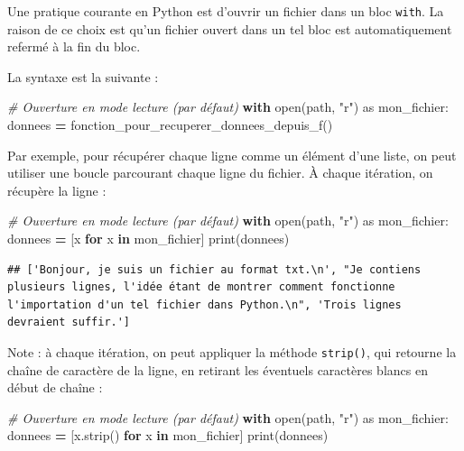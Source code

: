 \documentclass[12pt,]{book}
\newenvironment{Shaded}{\begin{snugshade}}{\end{snugshade}}
\newcommand{\KeywordTok}[1]{\textcolor[rgb]{0.13,0.29,0.53}{\textbf{#1}}}
\newcommand{\StringTok}[1]{\textcolor[rgb]{0.31,0.60,0.02}{#1}}
\newcommand{\ImportTok}[1]{#1}
\newcommand{\CommentTok}[1]{\textcolor[rgb]{0.56,0.35,0.01}{\textit{#1}}}
\newcommand{\ControlFlowTok}[1]{\textcolor[rgb]{0.13,0.29,0.53}{\textbf{#1}}}
\newcommand{\OperatorTok}[1]{\textcolor[rgb]{0.81,0.36,0.00}{\textbf{#1}}}
\newcommand{\BuiltInTok}[1]{#1}
\newcommand{\NormalTok}[1]{#1}
\numberwithin{equation}{section}
\numberwithin{countremarque}{section}
\begin{document}
Une pratique courante en Python est d'ouvrir un fichier dans un bloc
\texttt{with}. La raison de ce choix est qu'un fichier ouvert dans un
tel bloc est automatiquement refermé à la fin du bloc.

La syntaxe est la suivante :

\begin{Shaded}
\begin{Highlighting}[]
\CommentTok{# Ouverture en mode lecture (par défaut)}
\ControlFlowTok{with} \BuiltInTok{open}\NormalTok{(path, }\StringTok{"r"}\NormalTok{) }\ImportTok{as}\NormalTok{ mon_fichier:}
\NormalTok{  donnees }\OperatorTok{=}\NormalTok{ fonction_pour_recuperer_donnees_depuis_f()}
\end{Highlighting}
\end{Shaded}

Par exemple, pour récupérer chaque ligne comme un élément d'une liste,
on peut utiliser une boucle parcourant chaque ligne du fichier. À chaque
itération, on récupère la ligne :

\begin{Shaded}
\begin{Highlighting}[]
\CommentTok{# Ouverture en mode lecture (par défaut)}
\ControlFlowTok{with} \BuiltInTok{open}\NormalTok{(path, }\StringTok{"r"}\NormalTok{) }\ImportTok{as}\NormalTok{ mon_fichier:}
\NormalTok{  donnees }\OperatorTok{=}\NormalTok{ [x }\ControlFlowTok{for}\NormalTok{ x }\KeywordTok{in}\NormalTok{ mon_fichier]}
\BuiltInTok{print}\NormalTok{(donnees)}
\end{Highlighting}
\end{Shaded}

\begin{lstlisting}
## ['Bonjour, je suis un fichier au format txt.\n', "Je contiens plusieurs lignes, l'idée étant de montrer comment fonctionne l'importation d'un tel fichier dans Python.\n", 'Trois lignes devraient suffir.']
\end{lstlisting}

Note : à chaque itération, on peut appliquer la méthode
\texttt{strip()}, qui retourne la chaîne de caractère de la ligne, en
retirant les éventuels caractères blancs en début de chaîne :

\begin{Shaded}
\begin{Highlighting}[]
\CommentTok{# Ouverture en mode lecture (par défaut)}
\ControlFlowTok{with} \BuiltInTok{open}\NormalTok{(path, }\StringTok{"r"}\NormalTok{) }\ImportTok{as}\NormalTok{ mon_fichier:}
\NormalTok{  donnees }\OperatorTok{=}\NormalTok{ [x.strip() }\ControlFlowTok{for}\NormalTok{ x }\KeywordTok{in}\NormalTok{ mon_fichier]}
\BuiltInTok{print}\NormalTok{(donnees)}
\end{Highlighting}
\end{Shaded}
\end{document}
